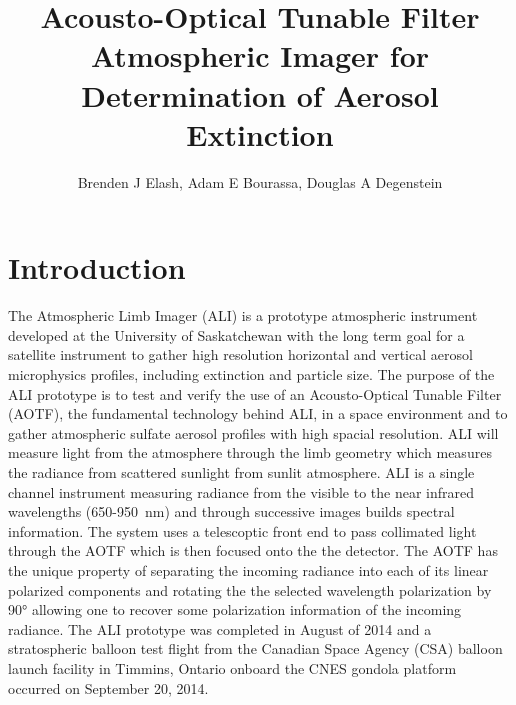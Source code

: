 \documentclass[12pt]{article}
\title{Acousto-Optical Tunable Filter Atmospheric Imager for Determination of Aerosol Extinction}
\author{Brenden J Elash, Adam E Bourassa, Douglas A Degenstein}
\begin{document}
\renewcommand\bibname{BiBTex.bib}

\maketitle

\section{Introduction}

The Atmospheric Limb Imager (ALI) is a prototype atmospheric instrument developed at the University of Saskatchewan with the long term goal for a satellite instrument to gather high resolution horizontal and vertical aerosol microphysics profiles, including extinction and particle size. The purpose of the ALI prototype is to test and verify the use of an Acousto-Optical Tunable Filter (AOTF), the fundamental technology behind ALI, in a space environment and to gather atmospheric sulfate aerosol profiles with high spacial resolution. ALI will measure light from the atmosphere through the limb geometry which measures the radiance from scattered sunlight from sunlit atmosphere. ALI is a single channel instrument measuring radiance from the visible to the near infrared wavelengths (650-950~nm) and through successive images builds spectral information. The system uses a telescoptic front end to pass collimated light through the AOTF which is then focused onto the the detector. The AOTF has the unique property of separating the incoming radiance into each of its linear polarized components and rotating the the selected wavelength polarization by 90\si{\degree} allowing one to recover some polarization information of the incoming radiance. The ALI prototype was completed in August of 2014 and a stratospheric balloon test flight from the Canadian Space Agency (CSA) balloon launch facility in Timmins, Ontario onboard the CNES gondola platform occurred on September 20, 2014.
\end{document}
